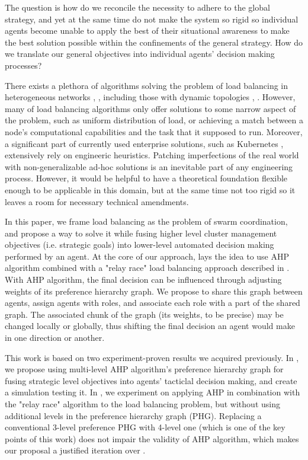 The question is how do we reconcile the necessity to adhere to the global strategy, and yet at the same time do not make
the system so rigid so individual agents become unable to apply the best of their situational awareness to make the best
solution possible within the confinements of the general strategy. How do we translate our general objectives into
individual agents' decision making processes?

There exists a plethora of algorithms solving the problem of load balancing in heterogeneous networks \cite{gamal-2019}, \cite{adhikari-2018}, including those with dynamic topologies \cite{sahoo-2020}, \cite{zhang-2018}.
However, many of load balancing algorithms only offer solutions to some narrow aspect of the problem, such as uniform distribution of load, or achieving a match between a node's computational capabilities and the task that it supposed to run.
Moreover, a significant part of currently used enterprise solutions, such as Kubernetes \cite{kubernet17}, extensively rely on engineeric heuristics.
Patching imperfections of the real world with non-generalizable ad-hoc solutions is an inevitable part of any engineering process.
However, it would be helpful to have a theoretical foundation flexible enough to be applicable in this domain, but at the same time not too rigid so it leaves a room for necessary technical amendments.

In this paper, we frame load balancing as the problem of swarm coordination, and propose a way to solve it while fusing higher level cluster management objectives (i.e. strategic goals) into lower-level automated decision making performed by an agent.
At the core of our approach, lays the idea to use AHP \cite{saaty-2008} algorithm combined with a "relay race" load balancing approach described in \cite{gorodetskii-2012}.
With AHP algorithm, the final decision can be influenced through adjusting weights of its preference hierarchy graph.
We propose to share this graph between agents, assign agents with roles, and associate each role with a part of the shared graph.
The associated chunk of the graph (its weights, to be precise) may be changed locally or globally, thus shifting the final decision an agent would make in one direction or another.

This work is based on two experiment-proven results we acquired previously.
In \cite{murashov-2021}, we propose using multi-level AHP algorithm's preference hierarchy graph for fusing strategic level objectives into agents' tacticlal decision making, and create a simulation testing it.
In \cite{murashov-2022}, we experiment on applying AHP in combination with the "relay race" algorithm to the load balancing problem, but without using additional levels in the preference hierarchy graph (PHG).
Replacing a conventional 3-level preference PHG with 4-level one (which is one of the key points of this work) does not impair the validity of AHP algorithm, which makes our proposal a justified iteration over \cite{murashov-2022}.

